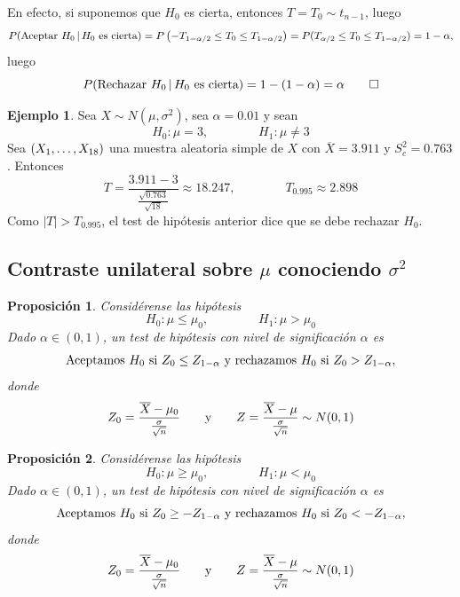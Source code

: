 \documentclass[11pt]{report}
\makeatletter
\renewenvironment{proof}[1][\proofname]{\par
  \pushQED{\qed}%
  \normalfont \topsep\z@skip %
  \trivlist
  \item[\hskip\labelsep
        \itshape
    #1\@addpunct{.}]\ignorespaces
}{%
  \popQED\endtrivlist\@endpefalse
}
\newtheorem{proposition}{Proposición}
\theoremstyle{definition}
\newtheorem{example}{Ejemplo}
\makeatother
\begin{document}
\begin{proof}
    En efecto, si suponemos que $H_0$ es cierta, entonces $T = T_0 \sim t_{n-1}$, luego
    \[P(\textup{Aceptar } H_0 \, | \, H_0 \textup{ es cierta}) = P\left(-T_{1-\alpha/2} \leq T_0 \leq T_{1-\alpha/2}\right) = P(T_{\alpha/2} \leq T_0 \leq T_{1-\alpha/2}) = 1-\alpha,\]
    luego
    \[P(\textup{Rechazar } H_0 \, | \, H_0 \textup{ es cierta}) = 1-(1-\alpha) = \alpha \qedhere\]
\end{proof}

\begin{example}
    Sea $X \sim N(\mu, \sigma^2)$, sea $\alpha=0.01$ y sean
    \[H_0 \colon \mu = 3, \qquad \qquad H_1 \colon \mu \neq 3\]
    Sea $(X_1,\mathellipsis,X_{18})$ una muestra aleatoria simple de $X$ con $\overline{X} = 3.911$ y $S^2_c = 0.763$.
    Entonces
    \[T =\frac{3.911-3}{\frac{\sqrt{0.763}}{\sqrt{18}}} \approx 18.247, \qquad \qquad T_{0.995} \approx 2.898\]
    Como $|T| > T_{0.995}$, el test de hipótesis anterior dice que se debe rechazar $H_0$.
\end{example}

\subsection{Contraste unilateral sobre \texorpdfstring{$\mu$}{TEXT} conociendo \texorpdfstring{$\sigma^2$}{TEXT}}

\begin{proposition}
    Considérense las hipótesis
    \[H_0 \colon \mu \leq \mu_0, \qquad \qquad H_1 \colon \mu > \mu_0\]
    Dado $\alpha \in (0,1)$, un test de hipótesis con nivel de significación $\alpha$ es
    \[\textup{{Aceptamos} } H_0 \textup{ {si} } Z_0 \leq Z_{1-\alpha} \textup{ {y rechazamos} } H_0 \textup{ {si} } Z_0 > Z_{1-\alpha},\]
    donde
    \[Z_{0} = \frac{\overline{X}-\mu_0}{\frac{\sigma}{\sqrt{n}}} \qquad \textup{y} \qquad Z =  \frac{\overline{X}-\mu}{\frac{\sigma}{\sqrt{n}}} \sim N(0,1)\]
\end{proposition}

\begin{proposition}
    Considérense las hipótesis
    \[H_0 \colon \mu \geq \mu_0, \qquad \qquad H_1 \colon \mu < \mu_0\]
    Dado $\alpha \in (0,1)$, un test de hipótesis con nivel de significación $\alpha$ es
    \[\textup{{Aceptamos} } H_0 \textup{ {si} } Z_0 \geq -Z_{1-\alpha} \textup{ {y rechazamos} } H_0 \textup{ {si} } Z_0 < -Z_{1-\alpha},\]
    donde
    \[Z_{0} = \frac{\overline{X}-\mu_0}{\frac{\sigma}{\sqrt{n}}} \qquad \textup{y} \qquad Z =  \frac{\overline{X}-\mu}{\frac{\sigma}{\sqrt{n}}} \sim N(0,1)\]
\end{proposition}
\end{document}
